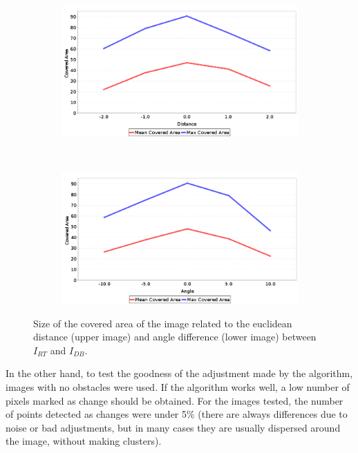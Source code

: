 \begin{figure}[t]
\centering
  \begin{subfigure}[b]{0.45\textwidth}
  \centering
    \includegraphics[width=\textwidth]{distance_vs_area}\label{fig:cp01_distance_vs_area}
  \end{subfigure}%
  ~
  \begin{subfigure}[b]{0.45\textwidth}
    \centering
    \includegraphics[width=\textwidth]{angle_vs_area}\label{fig:cp01_angle_vs_area}
  \end{subfigure}%
  \caption{Size of the covered area of the image related to the euclidean distance (upper image) and angle difference (lower image) between $I_{RT}$ and $I_{DB}$.}\label{fig:cp01_area_covered}
\end{figure}

In the other hand, to test the goodness of the adjustment made by the algorithm, images with no obstacles were used. If the algorithm works well, a low number of pixels marked as change should be obtained. For the images tested, the number of points detected as changes were under 5\% (there are always differences due to noise or bad adjustments, but in many cases they are usually dispersed around the image, without making clusters).

